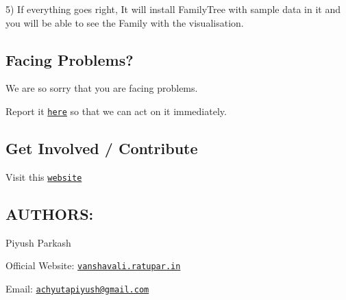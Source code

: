 5) If everything goes right, It will install Family\-Tree with sample data in it and you will be able to see the Family with the visualisation.

\subsection*{Facing Problems? }

We are so sorry that you are facing problems.

Report it \href{https://github.com/piyushparkash/FamilyTree/issues}{\tt here} so that we can act on it immediately.

\subsection*{Get Involved / Contribute }

Visit this \href{http://vanshavali.ratupar.in}{\tt website}

\subsection*{A\-U\-T\-H\-O\-R\-S\-: }

Piyush Parkash

Official Website\-: \href{http://vanshavali.ratupar.in}{\tt vanshavali.\-ratupar.\-in}

Email\-: \href{mailto:achyutapiyush@gmail.com}{\tt achyutapiyush@gmail.\-com} 